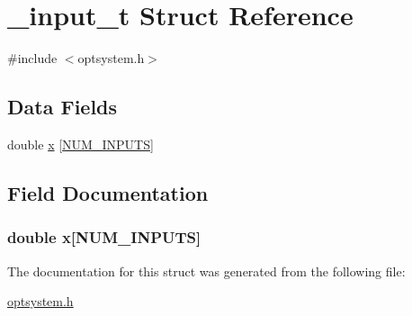 \hypertarget{a00002}{\section{\-\_\-input\-\_\-t \-Struct \-Reference}
\label{d7/d46/a00002}
}


{\ttfamily \#include $<$optsystem.\-h$>$}

\subsection*{\-Data \-Fields}
\begin{DoxyCompactItemize}
\item 
double \hyperlink{a00002_a7d1a4a5ea0ec8aa9f7625bee5113c134_a7d1a4a5ea0ec8aa9f7625bee5113c134}{x} \mbox{[}\hyperlink{a00018_ad706a4e66dccbe66985b4c8785f28f3c_ad706a4e66dccbe66985b4c8785f28f3c}{\-N\-U\-M\-\_\-\-I\-N\-P\-U\-T\-S}\mbox{]}
\end{DoxyCompactItemize}


\subsection{\-Field \-Documentation}
\hypertarget{a00002_a7d1a4a5ea0ec8aa9f7625bee5113c134_a7d1a4a5ea0ec8aa9f7625bee5113c134}{
\subsubsection[{x}]{\setlength{\rightskip}{0pt plus 5cm}double {\bf x}\mbox{[}{\bf \-N\-U\-M\-\_\-\-I\-N\-P\-U\-T\-S}\mbox{]}}}\label{d7/d46/a00002_a7d1a4a5ea0ec8aa9f7625bee5113c134_a7d1a4a5ea0ec8aa9f7625bee5113c134}


\-The documentation for this struct was generated from the following file\-:\begin{DoxyCompactItemize}
\item 
\hyperlink{a00018}{optsystem.\-h}\end{DoxyCompactItemize}

